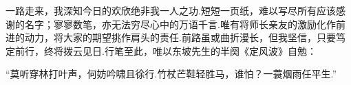 一路走来，我深知今日的欢欣绝非我一人之功.短短一页纸，难以写尽所有应该感谢的名字；寥寥数笔，亦无法穷尽心中的万语千言.唯有将师长亲友的激励化作前进的动力，将大家的期望挑作肩头的责任.前路虽或曲折漫长，但我坚信，只要笃定前行，终将拨云见日.行笔至此，唯以东坡先生的半阕《定风波》自勉：

“莫听穿林打叶声，何妨吟啸且徐行.竹杖芒鞋轻胜马，谁怕？一蓑烟雨任平生.”











  \iflib
  \else
  \newpage
  \cleardoublepage
  \fi

